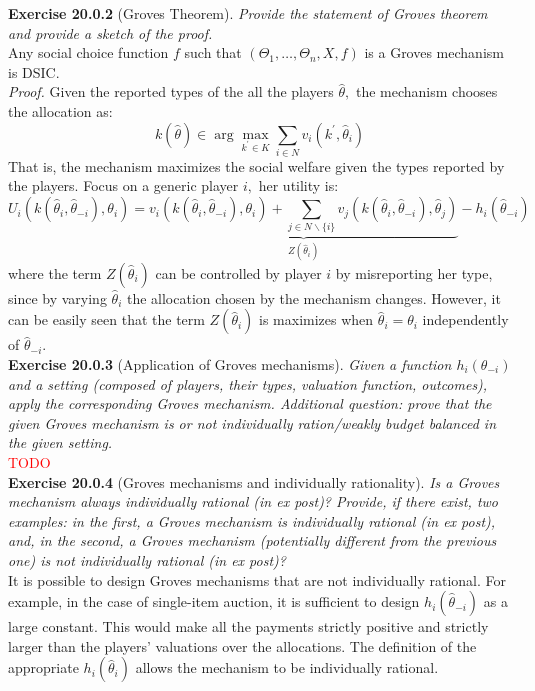 \textbf{Exercise 20.0.2} (Groves Theorem). \textit{Provide the statement of Groves theorem and provide a sketch of the proof.}\\

Any social choice function $f$ such that $\left(\Theta_{1}, \ldots, \Theta_{n}, X, f\right)$ is a Groves mechanism is DSIC.\\
\textit{Proof.} Given the reported types of the all the players $\hat{\theta},$ the mechanism chooses the allocation as:
$$
k(\hat{\theta}) \in \arg \max _{k^{\prime} \in K} \sum_{i \in N} v_{i}\left(k^{\prime}, \hat{\theta}_{i}\right)
$$
That is, the mechanism maximizes the social welfare given the types reported by the players. Focus on a generic player $i,$ her utility is:
$$
U_{i}\left(k\left(\hat{\theta}_{i}, \hat{\theta}_{-i}\right), \theta_{i}\right)= \underbrace{v_{i}\left(k\left(\hat{\theta}_{i}, \hat{\theta}_{-i}\right), \theta_{i}\right)+\sum_{j \in N \backslash\{i\}} v_{j}\left(k\left(\hat{\theta}_{i}, \hat{\theta}_{-i}\right), \hat{\theta}_{j}\right)}_{Z(\hat{\theta}_{i})}-h_{i}\left(\hat{\theta}_{-i}\right)
$$
where the term $Z(\hat{\theta}_{i})$ can be controlled by player $i$ by misreporting her type, since by varying $\hat{\theta}_{i}$ the allocation chosen by the mechanism changes. However, it can be easily seen that the term $Z(\hat{\theta}_{i})$ is maximizes when $\hat{\theta}_{i}=\theta_{i}$ independently of $\hat{\theta}_{-i}$.\\

\textbf{Exercise 20.0.3} (Application of Groves mechanisms). \textit{Given a function $h_i (\theta_{-i})$ and a setting (composed of players, their types, valuation function, outcomes), apply the corresponding Groves mechanism. Additional question: prove that the given Groves mechanism is or not individually ration/weakly budget balanced in the given setting.}\\

\textcolor{red}{TODO}\\

\textbf{Exercise 20.0.4} (Groves mechanisms and individually rationality). \textit{Is a Groves mechanism always individually rational (in ex post)? Provide, if there exist, two examples: in the first, a Groves mechanism is individually rational (in ex post), and, in the second, a Groves mechanism (potentially different from the previous one) is not individually rational (in ex post)?}\\

It is possible to design Groves mechanisms that are not individually rational. For example, in the case of single-item auction, it is sufficient to design $h_i (\hat{\theta}_{-i})$ as a large constant. This would make all the payments strictly positive and strictly larger than the players' valuations over the allocations. The definition of the appropriate $h_i (\hat{\theta}_{i})$ allows the mechanism to be individually rational.\\

